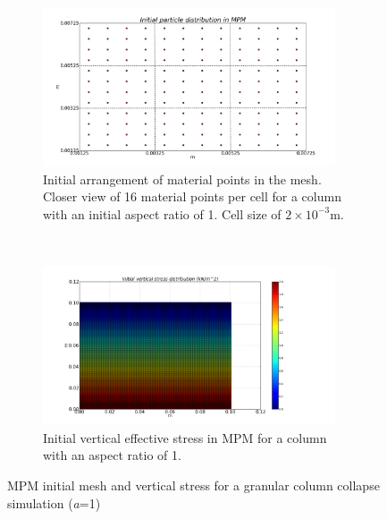 \begin{figure}[tbhp]
\centering
\begin{subfigure}[b]{0.95\textwidth}
\centering
\includegraphics[width=0.95\textwidth]{ini_mesh_mpm_column}
\caption{Initial arrangement of material points in the mesh. Closer view of 
16 material points per cell for a column with an initial aspect ratio of 1. 
Cell size of $2\times10^{-3}\si{\m}$.}
\label{fig:ini_mesh_mpm_column}
\end{subfigure}
\\
\begin{subfigure}[b]{0.95\textwidth}
\centering
\includegraphics[width=0.95\textwidth]{ini_stress_mpm_column}
\caption{Initial vertical effective stress in MPM for a column with an aspect 
ratio of 1.}
\label{fig:ini_stress_mpm_column}
\end{subfigure}
\caption{MPM initial mesh and vertical stress for a granular column collapse 
simulation (\textit{a}=1)}
\label{fig:MPM_Sample}
\end{figure}




